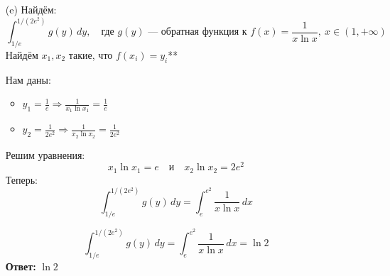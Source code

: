 \documentclass[a4paper]{article}
\begin{document}
\begin{enumerate}
\begin{enumerate}
        \item[(e)]Найдём:
        \[
        \int_{1/e}^{1/(2e^2)} g(y) \, dy,\quad \text{где } g(y) \text{ — обратная функция к } f(x) = \frac{1}{x \ln x},\ x \in (1, +\infty)
        \]
        Найдём \( x_1, x_2 \) такие, что \( f(x_i) = y_i \)**

        Нам даны:
        \begin{itemize}
            \item \( y_1 = \frac{1}{e} \Rightarrow \frac{1}{x_1 \ln x_1} = \frac{1}{e} \)
            \item \( y_2 = \frac{1}{2e^2} \Rightarrow \frac{1}{x_2 \ln x_2} = \frac{1}{2e^2} \)
        \end{itemize}
        Решим уравнения:
        $$ x_1 \ln x_1 = e \quad \text{и} \quad x_2 \ln x_2 = 2e^2 $$
        Теперь:
        \[
        \int_{1/e}^{1/(2e^2)} g(y) \, dy = \int_{e}^{e^2} \frac{1}{x \ln x} \, dx
        \]
        
        \[
        \int_{1/e}^{1/(2e^2)} g(y) \, dy = \int_{e}^{e^2} \frac{1}{x \ln x} \, dx = \ln 2
        \]
        \textbf{Ответ: } $\ln 2$

    \end{enumerate}

\end{enumerate}
\end{document}
